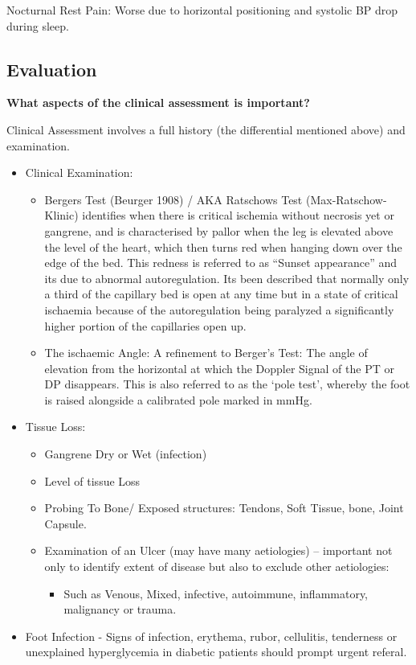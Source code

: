 \documentclass[
]{book}
\providecommand{\tightlist}{%
  \setlength{\itemsep}{0pt}\setlength{\parskip}{0pt}}
\begin{document}
Nocturnal Rest Pain: Worse due to horizontal positioning and systolic BP
drop during sleep.

\hypertarget{evaluation-12}{%
\subsection{Evaluation}\label{evaluation-12}}

\textbf{What aspects of the clinical assessment is important?}

Clinical Assessment involves a full history (the differential mentioned
above) and examination.

\begin{itemize}
\item
  Clinical Examination:

  \begin{itemize}
  \item
    Bergers Test (Beurger 1908) / AKA Ratschows Test
    (Max-Ratschow-Klinic) identifies when there is critical ischemia
    without necrosis yet or gangrene, and is characterised by pallor
    when the leg is elevated above the level of the heart, which
    then turns red when hanging down over the edge of the bed. This
    redness is referred to as ``Sunset appearance'' and its due to
    abnormal autoregulation. Its been described that normally only a
    third of the capillary bed is open at any time but in a state of
    critical ischaemia because of the autoregulation being paralyzed
    a significantly higher portion of the capillaries open up.
  \item
    The ischaemic Angle: A refinement to Berger's Test: The angle of
    elevation from the horizontal at which the Doppler Signal of the
    PT or DP disappears. This is also referred to as the `pole
    test', whereby the foot is raised alongside a calibrated pole
    marked in mmHg.
  \end{itemize}
\item
  Tissue Loss:

  \begin{itemize}
  \item
    Gangrene Dry or Wet (infection)
  \item
    Level of tissue Loss
  \item
    Probing To Bone/ Exposed structures: Tendons, Soft Tissue, bone,
    Joint Capsule.
  \item
    Examination of an Ulcer (may have many aetiologies) -- important
    not only to identify extent of disease but also to exclude other
    aetiologies:

    \begin{itemize}
    \tightlist
    \item
      Such as Venous, Mixed, infective, autoimmune, inflammatory,
      malignancy or trauma.
    \end{itemize}
  \end{itemize}
\item
  Foot Infection - Signs of infection, erythema, rubor, cellulitis,
  tenderness or unexplained hyperglycemia in diabetic patients should
  prompt urgent referal.\citep{kalish2010}
\end{itemize}
\end{document}
